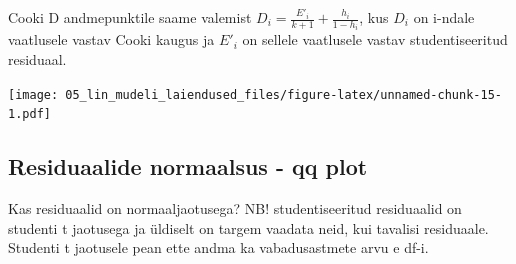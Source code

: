 \documentclass[]{book}
\newenvironment{Shaded}{\begin{snugshade}}{\end{snugshade}}
\newcommand{\KeywordTok}[1]{\textcolor[rgb]{0.13,0.29,0.53}{\textbf{#1}}}
\newcommand{\DataTypeTok}[1]{\textcolor[rgb]{0.13,0.29,0.53}{#1}}
\newcommand{\DecValTok}[1]{\textcolor[rgb]{0.00,0.00,0.81}{#1}}
\newcommand{\StringTok}[1]{\textcolor[rgb]{0.31,0.60,0.02}{#1}}
\newcommand{\OtherTok}[1]{\textcolor[rgb]{0.56,0.35,0.01}{#1}}
\newcommand{\OperatorTok}[1]{\textcolor[rgb]{0.81,0.36,0.00}{\textbf{#1}}}
\newcommand{\NormalTok}[1]{#1}
\begin{document}
Cooki D andmepunktile saame valemist
\(D_i = \frac{E'_i}{k+1} + \frac{h_i}{1-h_i}\), kus \(D_i\) on i-ndale
vaatlusele vastav Cooki kaugus ja \({E'_i}\) on sellele vaatlusele
vastav studentiseeritud residuaal.

\begin{Shaded}
\end{Shaded}

\texttt{[image: 05\_lin\_mudeli\_laiendused\_files/figure-latex/unnamed-chunk-15-1.pdf]}

\subsection*{Residuaalide normaalsus - qq
plot}\label{residuaalide-normaalsus---qq-plot}

Kas residuaalid on normaaljaotusega? NB! studentiseeritud residuaalid on
studenti t jaotusega ja üldiselt on targem vaadata neid, kui tavalisi
residuaale. Studenti t jaotusele pean ette andma ka vabadusastmete arvu
e df-i.

\begin{Shaded}
\end{Shaded}
\end{document}
